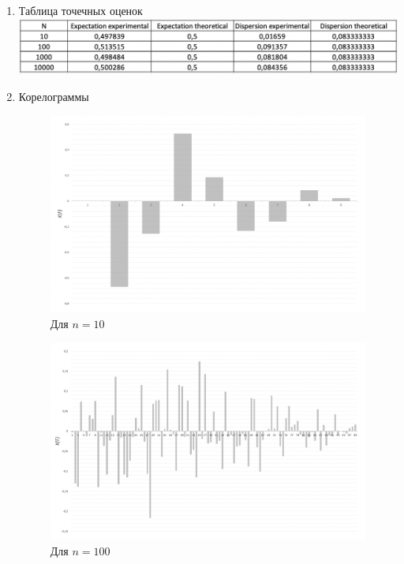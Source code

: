 \documentclass{article}
\begin{document}
		\begin{enumerate}
			\item Таблица точечных оценок\\
				\includegraphics[scale=0.5]{table.png}
				
			\item Корелограммы\\
				\begin{figure}[!htb]
					\includegraphics[scale=0.35]{1.png}
					\caption{Для $n = 10$}
				\end{figure}
				
				\begin{figure}[!htb]
					\includegraphics[scale=0.35]{2.png}
					\caption{Для $n = 100$}
				\end{figure}
				

\end{enumerate}
\end{document}
